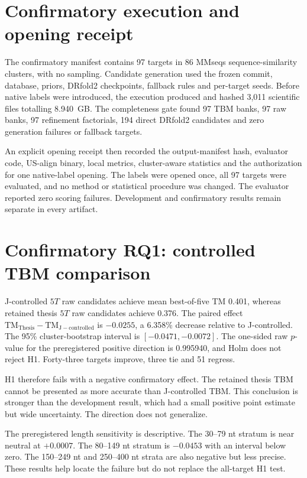 \documentclass[12pt,a4paper,oneside]{report}
\begin{document}
\section{Confirmatory execution and opening receipt}

The confirmatory manifest contains 97 targets in 86 MMseqs sequence-similarity
clusters, with no sampling. Candidate generation used the frozen commit, database,
priors, DRfold2 checkpoints, fallback rules and per-target seeds. Before native labels
were introduced, the execution produced and hashed 3,011 scientific files totalling
8.940~GB. The completeness gate found 97 TBM banks, 97 raw banks, 97 refinement
factorials, 194 direct DRfold2 candidates and zero generation failures or fallback
targets.

An explicit opening receipt then recorded the output-manifest hash, evaluator code,
US-align binary, local metrics, cluster-aware statistics and the authorization for one
native-label opening. The labels were opened once, all 97 targets were evaluated, and
no method or statistical procedure was changed. The evaluator reported zero scoring
failures. Development and confirmatory results remain separate in every artifact.

\section{Confirmatory RQ1: controlled TBM comparison}

J-controlled $5T$ raw candidates achieve mean best-of-five TM 0.401, whereas retained
thesis $5T$ raw candidates achieve 0.376. The paired effect
$\mathrm{TM}_{\mathrm{Thesis}}-\mathrm{TM}_{\mathrm{J-controlled}}$ is $-0.0255$, a
6.358\% decrease relative to J-controlled. The 95\% cluster-bootstrap interval is
$[-0.0471,-0.0072]$. The one-sided raw $p$-value for the preregistered positive
direction is 0.995940, and Holm does not reject H1. Forty-three targets improve, three
tie and 51 regress.

H1 therefore fails with a negative confirmatory effect. The retained thesis TBM
cannot be presented as more accurate than J-controlled TBM. This conclusion is
stronger than the development result, which had a small positive point estimate but
wide uncertainty. The direction does not generalize.

The preregistered length sensitivity is descriptive. The 30–79 nt stratum is near
neutral at $+0.0007$. The 80–149 nt stratum is $-0.0453$ with an interval below zero.
The 150–249 nt and 250–400 nt strata are also negative but less precise. These
results help locate the failure but do not replace the all-target H1 test.
\end{document}
